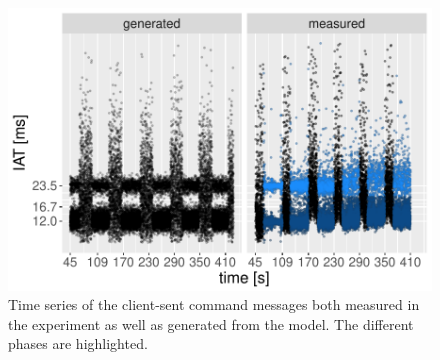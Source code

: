 \begin{figure}[t]
	\centering
	\includegraphics[width=1.0\columnwidth]{images/command-ts-annotated.pdf}
	\caption{Time series of the client-sent command messages both measured in the experiment as well as generated from the model. The different phases are highlighted.}
\label{fig:command-timeseries}
\end{figure}







